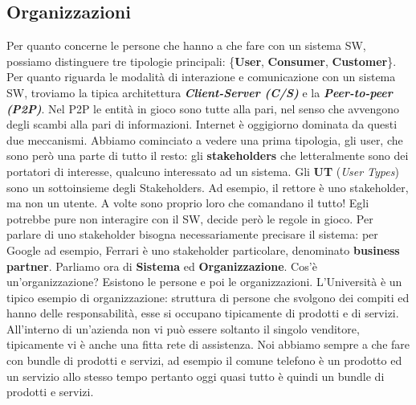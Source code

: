 \subsection{Organizzazioni}

Per quanto concerne le persone che hanno a che fare con un sistema SW, possiamo distinguere tre tipologie principali: \{\textbf{User}, \textbf{Consumer}, \textbf{ Customer}\}. Per quanto riguarda le modalità di interazione e comunicazione con un sistema SW, troviamo la tipica architettura \textbf{\textit{Client-Server (C/S)}} e la \textbf{\textit{Peer-to-peer (P2P)}}. Nel P2P le entità in gioco sono tutte alla pari, nel senso che avvengono degli scambi alla pari di informazioni. Internet è oggigiorno dominata da questi due meccanismi. Abbiamo cominciato a vedere una prima tipologia, gli user, che sono però una parte di tutto il resto: gli \textbf{stakeholders} che letteralmente sono dei portatori di interesse, qualcuno interessato ad un sistema. Gli \textbf{UT} (\textit{User Types}) sono un sottoinsieme degli Stakeholders. Ad esempio, il rettore è uno stakeholder, ma non un utente. A volte sono proprio loro che comandano il tutto! Egli potrebbe pure non interagire con il SW, decide però le regole in gioco. Per parlare di uno stakeholder bisogna necessariamente precisare il sistema: per Google ad esempio, Ferrari è uno stakeholder particolare, denominato \textbf{business partner}. 
Parliamo ora di \textbf{Sistema} ed \textbf{Organizzazione}. Cos'è un'organizzazione? Esistono le persone e poi le organizzazioni. L'Università è un tipico esempio di organizzazione: struttura di persone che svolgono dei compiti ed hanno delle responsabilità, esse si occupano tipicamente di prodotti e di servizi. All'interno di un'azienda non vi può essere soltanto il singolo venditore, tipicamente vi è anche una fitta rete di assistenza. Noi abbiamo sempre a che fare con bundle di prodotti e servizi, ad esempio il comune telefono è un prodotto ed un servizio allo stesso tempo pertanto oggi quasi tutto è quindi un bundle di prodotti e servizi.  
